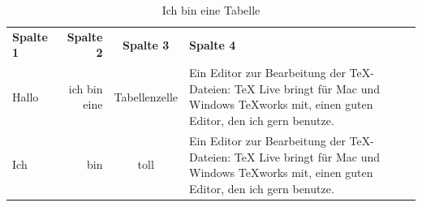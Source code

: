 \documentclass[ngerman,12pt]{scrartcl}
\begin{document}
\vspace*{1cm}

\begin{table}
\centering
\caption{Ich bin eine Tabelle}\label{tab:meineTabelle}
\begin{tabular}{lrcp{6cm}} \toprule[1.5pt]
\textbf{Spalte 1} & \textbf{Spalte 2} & \textbf{Spalte 3} & \textbf{Spalte 4} \\ \cmidrule[1pt](rl){1-4}
Hallo & ich bin eine & Tabellenzelle & Ein Editor zur Be\-ar\-beitung der TeX-Dateien: TeX Live bringt für Mac und Windows TeXworks mit, einen guten Editor, den ich gern benutze.  \\ \midrule[0.5pt]
Ich & bin & toll & Ein Editor zur Bearbeitung der TeX-Dateien: TeX Live bringt für Mac und Windows TeXworks mit, einen guten Editor, den ich gern benutze.  \\ \bottomrule[2.5pt]
\end{tabular}
\end{table}
\end{document}
